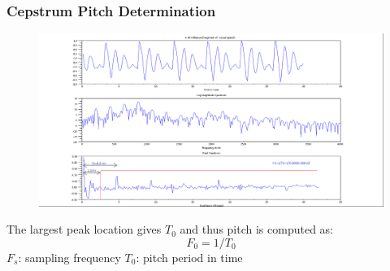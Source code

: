\documentclass{beamer}
\begin{document}
\begin{frame}
\frametitle{Cepstrum Pitch Determination}
\begin{figure}
\includegraphics[width=0.8\linewidth]{Image/Fig6.png}
\end{figure}
The largest peak location gives $T_0$ and thus pitch is computed as:\\
\begin{equation}
F_0= 1 / T_0
\end{equation}
\hspace{10mm} $F_s$: sampling frequency \hspace{10mm} $T_0$: pitch period in time





\end{frame}
\end{document}
